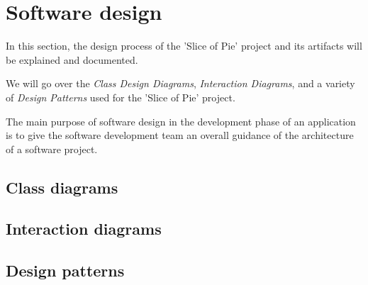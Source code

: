 \section{Software design}
In this section, the design process of the 'Slice of Pie' project and its artifacts will be explained and documented.

We will go over the \emph{Class Design Diagrams}, \emph{Interaction Diagrams}, and a variety of \emph{Design Patterns} used for the 'Slice of Pie' project.

The main purpose of software design in the development phase of an application is to give the software development team an overall guidance of the architecture of a software project.

\subsection{Class diagrams}


\subsection{Interaction diagrams}


\subsection{Design patterns}
